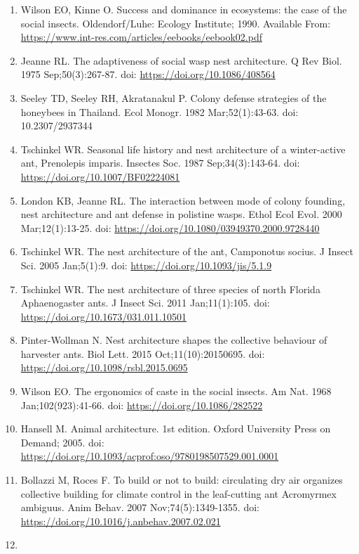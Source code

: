 \documentclass[3p]{elsarticle} %
\begin{document}
\begin{enumerate}
\def\labelenumi{\arabic{enumi}.}
\item
  Wilson EO, Kinne O. Success and dominance in ecosystems: the case of
  the social insects. Oldendorf/Luhe: Ecology Institute; 1990. Available
  From: \url{https://www.int-res.com/articles/eebooks/eebook02.pdf}
\item
  Jeanne RL. The adaptiveness of social wasp nest architecture. Q Rev
  Biol. 1975 Sep;50(3):267-87. doi: \url{https://doi.org/10.1086/408564}
\item
  Seeley TD, Seeley RH, Akratanakul P. Colony defense strategies of the
  honeybees in Thailand. Ecol Monogr. 1982 Mar;52(1):43-63. doi:
  10.2307/2937344
\item
  Tschinkel WR. Seasonal life history and nest architecture of a
  winter-active ant, Prenolepis imparis. Insectes Soc. 1987
  Sep;34(3):143-64. doi: \url{https://doi.org/10.1007/BF02224081}
\item
  London KB, Jeanne RL. The interaction between mode of colony founding,
  nest architecture and ant defense in polistine wasps. Ethol Ecol Evol.
  2000 Mar;12(1):13-25. doi:
  \url{https://doi.org/10.1080/03949370.2000.9728440}
\item
  Tschinkel WR. The nest architecture of the ant, Camponotus socius. J
  Insect Sci. 2005 Jan;5(1):9. doi:
  \url{https://doi.org/10.1093/jis/5.1.9}
\item
  Tschinkel WR. The nest architecture of three species of north Florida
  Aphaenogaster ants. J Insect Sci. 2011 Jan;11(1):105. doi:
  \url{https://doi.org/10.1673/031.011.10501}
\item
  Pinter-Wollman N. Nest architecture shapes the collective behaviour of
  harvester ants. Biol Lett. 2015 Oct;11(10):20150695. doi:
  \url{https://doi.org/10.1098/rsbl.2015.0695}
\item
  Wilson EO. The ergonomics of caste in the social insects. Am Nat. 1968
  Jan;102(923):41-66. doi: \url{https://doi.org/10.1086/282522}
\item
  Hansell M. Animal architecture. 1st edition. Oxford University Press
  on Demand; 2005. doi:
  \url{https://doi.org/10.1093/acprof:oso/9780198507529.001.0001}
\item
  Bollazzi M, Roces F. To build or not to build: circulating dry air
  organizes collective building for climate control in the leaf-cutting
  ant Acromyrmex ambiguus. Anim Behav. 2007 Nov;74(5):1349-1355. doi:
  \url{https://doi.org/10.1016/j.anbehav.2007.02.021}
\item

\end{enumerate}
\end{document}
